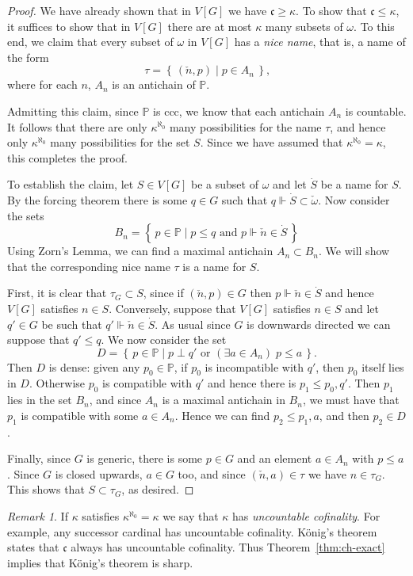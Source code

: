 \documentclass[11pt,oneside]{amsbook}
\newcommand{\set}[1]{\left\{\,#1\,\right\}}
\newcommand{\PP}{\mathbb P}
\newcommand{\forces}{\Vdash}
\theoremstyle{definition}
\theoremstyle{plain}
\theoremstyle{definition}
\theoremstyle{remark}
\newtheorem{rem}[thm]{Remark}
\begin{document}
\begin{proof}
  We have already shown that in $V[G]$ we have $\mathfrak c\geq\kappa$. To show that $\mathfrak c\leq\kappa$, it suffices to show that in $V[G]$ there are at most $\kappa$ many subsets of $\omega$. To this end, we claim that every subset of $\omega$ in $V[G]$ has a \emph{nice name}, that is, a name of the form
  \[\tau=\set{(\check n,p)\mid p\in A_n}\text{,}
  \]
  where for each $n$, $A_n$ is an antichain of $\PP$.

  Admitting this claim, since $\PP$ is ccc, we know that each antichain $A_n$ is countable. It follows that there are only $\kappa^{\aleph_0}$ many possibilities for the name $\tau$, and hence only $\kappa^{\aleph_0}$ many possibilities for the set $S$. Since we have assumed that $\kappa^{\aleph_0}=\kappa$, this completes the proof.

  To establish the claim, let $S\in V[G]$ be a subset of $\omega$ and let $\dot S$ be a name for $S$. By the forcing theorem there is some $q\in G$ such that $q\forces\dot S\subset\check\omega$. Now consider the sets
  \[B_n=\set{p\in\PP\mid p\leq q\text{ and }p\forces\check n\in\dot S}
  \]
  Using Zorn's Lemma, we can find a maximal antichain $A_n\subset B_n$. We will show that the corresponding nice name $\tau$ is a name for $S$.

  First, it is clear that $\tau_G\subset S$, since if $(\check n,p)\in G$ then $p\forces\check n\in\dot S$ and hence $V[G]$ satisfies $n\in S$. Conversely, suppose that $V[G]$ satisfies $n\in S$ and let $q'\in G$ be such that $q'\forces\check n\in\dot S$. As usual since $G$ is downwards directed we can suppose that $q'\leq q$. We now consider the set
  \[D=\set{p\in\PP\mid p\perp q'\text{ or }(\exists a\in A_n)\;p\leq a}\text{.}
  \]
  Then $D$ is dense: given any $p_0\in\PP$, if $p_0$ is incompatible with $q'$, then $p_0$ itself lies in $D$. Otherwise $p_0$ is compatible with $q'$ and hence there is $p_1\leq p_0,q'$. Then $p_1$ lies in the set $B_n$, and since $A_n$ is a maximal antichain in $B_n$, we must have that $p_1$ is compatible with some $a\in A_n$. Hence we can find $p_2\leq p_1,a$, and then $p_2\in D$.

  Finally, since $G$ is generic, there is some $p\in G$ and an element $a\in A_n$ with $p\leq a$. Since $G$ is closed upwards, $a\in G$ too, and since $(\check n,a)\in\tau$ we have $n\in\tau_G$. This shows that $S\subset\tau_G$, as desired.
\end{proof}

\begin{rem}
  If $\kappa$ satisfies $\kappa^{\aleph_0}=\kappa$ we say that $\kappa$ has \emph{uncountable cofinality}. For example, any successor cardinal has uncountable cofinality. K\"onig's theorem states that $\mathfrak c$ always has uncountable cofinality. Thus Theorem~\ref{thm:ch-exact} implies that K\"onig's theorem is sharp.
\end{rem}
\end{document}
